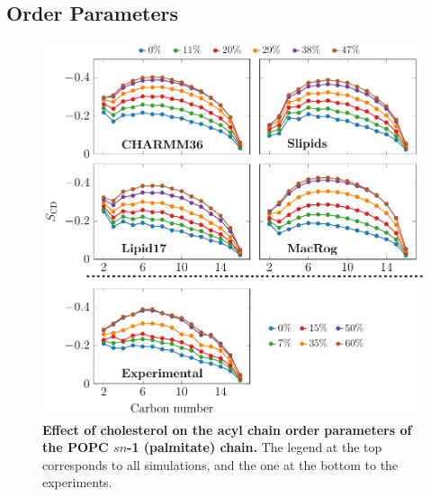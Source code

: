 \documentclass[journal=jpcbfk]{achemso}
\begin{document}
\clearpage
\subsection{Order Parameters}

\begin{figure}[htb!]
    \centering
    \includegraphics[width=0.9\linewidth]{../FIGS/palmitate.pdf}
    \caption{\label{SIfig:palmitate}%
     \textbf{Effect of cholesterol on the acyl chain order parameters of the POPC $sn$-1 (palmitate) chain.}
     The legend at the top corresponds to all simulations, and the one at the bottom to the experiments.
    }
\end{figure}
\end{document}
